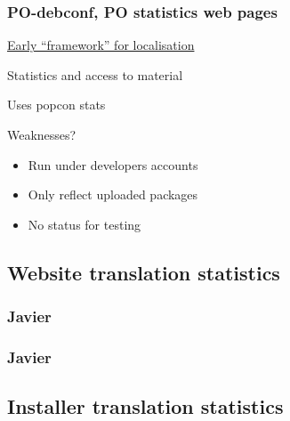 \documentclass{beamer}
\begin{document}
\begin{frame}
  \frametitle{PO-debconf, PO statistics web pages}
	\begin{block}
		{\href{http://www.debian.org/intl/l10n/po-debconf/fr}{Early ``framework'' for localisation}}
	\end{block}
	\begin{block}
		{Statistics and access to material}
	\end{block}
	\begin{block}
		{Uses popcon stats}
	\end{block}
	\begin{block}
		{Weaknesses?}
		\begin{itemize}
		\item
			Run under developers accounts
		\item
			Only reflect uploaded packages
		\item
			No status for testing
		\end{itemize}
	\end{block}
\end{frame}
	
\subsection{Website translation statistics}

\begin{frame}
  \frametitle{Javier}
\end{frame}

\begin{frame}
  \frametitle{Javier}
\end{frame}

\subsection{Installer translation statistics}
\end{document}

